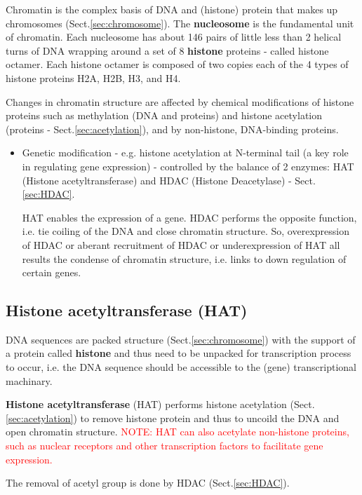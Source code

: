 Chromatin is the complex basis of DNA and (histone) protein that makes up
chromosomes (Sect.\ref{sec:chromosome}). The {\bf nucleosome} is the fundamental
unit of chromatin. Each nucleosome has about 146 pairs of little less than 2
helical turns of DNA wrapping around a set of 8 {\bf histone} proteins - called
histone octamer. Each histone octamer is composed of two copies each of the 4
types of histone proteins H2A, H2B, H3, and H4.

Changes in chromatin structure are affected by chemical modifications of histone
proteins such as methylation (DNA and proteins) and histone acetylation
(proteins - Sect.\ref{sec:acetylation}), and by non-histone, DNA-binding proteins.
\begin{itemize}
  \item  Genetic modification - e.g. histone acetylation at N-terminal tail (a
  key role in regulating gene expression) - controlled by the balance of 2
  enzymes: HAT (Histone acetyltransferase) and HDAC (Histone Deacetylase) -
  Sect.\ref{sec:HDAC}.
  
HAT enables the expression of a gene. HDAC performs the opposite function, i.e.
tie coiling of the DNA and close chromatin structure. So, overexpression of HDAC
or aberant recruitment of HDAC or underexpression of HAT all results the
condense of chromatin structure, i.e. links to down regulation of certain genes.
   
\end{itemize}

\subsection{Histone acetyltransferase (HAT)}
\label{sec:HAT}

DNA sequences are packed structure (Sect.\ref{sec:chromosome}) with the
support of a protein called {\bf histone} and thus need to be unpacked for
transcription process to occur, i.e. the DNA sequence should be accessible to
the (gene) transcriptional machinary.

{\bf Histone acetyltransferase} (HAT) performs histone acetylation
(Sect.\ref{sec:acetylation}) to remove histone protein and thus to uncoild the
DNA and open chromatin structure. \textcolor{red}{NOTE: HAT can also acetylate
non-histone proteins, such as nuclear receptors and other transcription factors
to facilitate gene expression.}

The removal of acetyl group is done by HDAC (Sect.\ref{sec:HDAC}).


